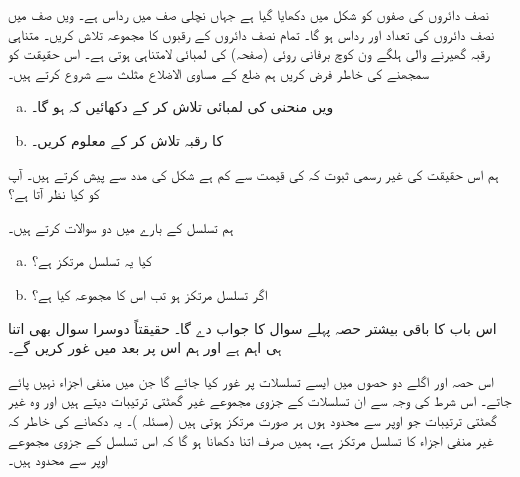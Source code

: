 نصف دائروں کی صفوں کو شکل  میں دکھایا گیا ہے جہاں نچلی صف میں رداس  ہے۔  ویں صف میں نصف دائروں کی تعداد   اور رداس  ہو گا۔ تمام نصف دائروں کے رقبوں کا مجموعہ تلاش کریں۔
متناہی رقبہ گھیرنے والی ہلگے ون کوچ برفانی روئی (صفحہ)  کی لمبائی لامتناہی ہوتی ہے۔ اس حقیقت کو سمجھنے کی خاطر فرض کریں ہم ضلع  کے مساوی الاضلاع مثلث سے شروع کرتے ہیں۔
\begin{enumerate}[a.]
\item
{} ویں منحنی  کی لمبائی  تلاش کر کے دکھائیں کہ   ہو گا۔
\item
{} کا رقبہ  تلاش کر کے  معلوم کریں۔
\end{enumerate}
ہم اس حقیقت کی غیر رسمی ثبوت کہ  کی قیمت  سے کم ہے شکل  کی مدد سے پیش کرتے ہیں۔ آپ کو کیا نظر آتا ہے؟




ہم تسلسل  کے بارے میں دو سوالات کرتے ہیں۔
\begin{enumerate}[a.]
\item
کیا یہ تسلسل مرتکز ہے؟
\item
اگر تسلسل مرتکز ہو تب اس کا مجموعہ کیا ہے؟
\end{enumerate}

اس باب کا باقی بیشتر حصہ پہلے سوال کا جواب دے گا۔ حقیقتاً دوسرا سوال بھی اتنا ہی اہم ہے اور ہم اس پر بعد میں غور کریں گے۔

اس حصہ   اور اگلے دو حصوں میں ایسے تسلسلات  پر غور کیا جائے گا جن میں منفی اجزاء نہیں پائے جاتے۔ اس شرط کی وجہ سے ان تسلسلات کے جزوی مجموعے غیر گھٹتی ترتیبات دیتے ہیں اور وہ غیر گھٹتی ترتیبات جو  اوپر سے محدود ہوں ہر صورت مرتکز ہوتی ہیں (مسئلہ )۔ یہ دکھانے کی خاطر کہ   غیر منفی اجزاء  کا تسلسل مرتکز ہے، ہمیں صرف اتنا دکھانا ہو گا کہ اس تسلسل کے جزوی مجموعے اوپر سے محدود ہیں۔

